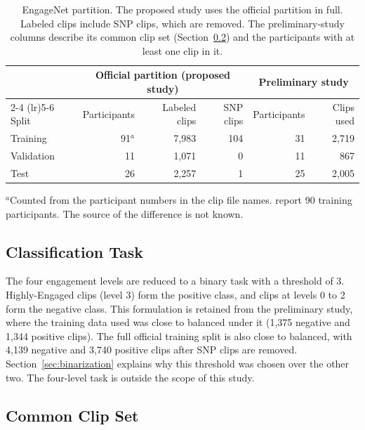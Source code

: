 \begin{table}[t]
   \centering
   \caption[EngageNet partition]{EngageNet partition. The proposed study uses the official partition in full. Labeled clips include SNP clips, which are removed. The preliminary-study columns describe its common clip set (Section~\ref{sec:commonset}) and the participants with at least one clip in it.}
   \label{tab:splits}
   \small
   \begin{tabular}{lrrrrr}
      \toprule
      & \multicolumn{3}{c}{Official partition (proposed study)} & \multicolumn{2}{c}{Preliminary study} \\
      \cmidrule(lr){2-4} \cmidrule(lr){5-6}
      Split & Participants & Labeled clips & SNP clips & Participants & Clips used \\
      \midrule
      Training & 91$^{a}$ & 7,983 & 104 & 31 & 2,719 \\
      Validation & 11 & 1,071 & 0 & 11 & 867 \\
      Test & 26 & 2,257 & 1 & 25 & 2,005 \\
      \bottomrule
   \end{tabular}

   \vspace{0.5ex}
   {\footnotesize $^{a}$Counted from the participant numbers in the clip file names.  report 90 training participants. The source of the difference is not known.\par}
\end{table}

\subsection{Classification Task}

The four engagement levels are reduced to a binary task with a threshold of 3. Highly-Engaged clips (level 3) form the positive class, and clips at levels 0 to 2 form the negative class. This formulation is retained from the preliminary study, where the training data used was close to balanced under it (1,375 negative and 1,344 positive clips). The full official training split is also close to balanced, with 4,139 negative and 3,740 positive clips after SNP clips are removed. Section~\ref{sec:binarization} explains why this threshold was chosen over the other two. The four-level task is outside the scope of this study.

\subsection{Common Clip Set}
\label{sec:commonset}

